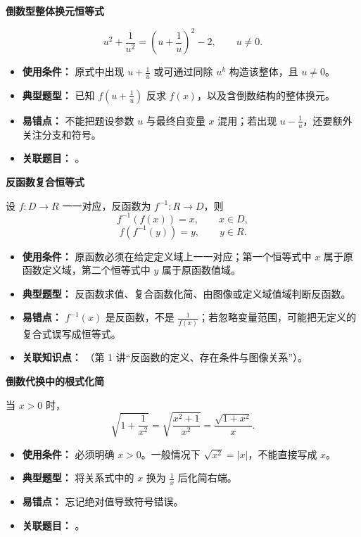
\begin{knowledgeBox}
\textbf{倒数型整体换元恒等式}

\[
u^2+\frac{1}{u^2}=\left(u+\frac{1}{u}\right)^2-2,\qquad u\ne 0.
\]

\begin{itemize}
  \item \textbf{使用条件：} 原式中出现 \(u+\frac{1}{u}\) 或可通过同除 \(u^k\) 构造该整体，且 \(u\ne 0\)。
  \item \textbf{典型题型：} 已知 \(f\left(u+\frac{1}{u}\right)\) 反求 \(f(x)\)，以及含倒数结构的整体换元。
  \item \textbf{易错点：} 不能把题设参数 \(u\) 与最终自变量 \(x\) 混用；若出现 \(u-\frac{1}{u}\)，还要额外关注分支和符号。
  \item \textbf{关联题目：} 。
\end{itemize}

\textbf{反函数复合恒等式}

设 \(f:D\to R\) 一一对应，反函数为 \(f^{-1}:R\to D\)，则
\[
f^{-1}(f(x))=x,\qquad x\in D,
\]
\[
f(f^{-1}(y))=y,\qquad y\in R.
\]

\begin{itemize}
  \item \textbf{使用条件：} 原函数必须在给定定义域上一一对应；第一个恒等式中 \(x\) 属于原函数定义域，第二个恒等式中 \(y\) 属于原函数值域。
  \item \textbf{典型题型：} 反函数求值、复合函数化简、由图像或定义域值域判断反函数。
  \item \textbf{易错点：} \(f^{-1}(x)\) 是反函数，不是 \(\frac{1}{f(x)}\)；若忽略变量范围，可能把无定义的复合式误写成恒等式。
  \item \textbf{关联知识点：} （第 1 讲“反函数的定义、存在条件与图像关系”）。
\end{itemize}

\textbf{倒数代换中的根式化简}

当 \(x>0\) 时，
\[
\sqrt{1+\frac{1}{x^2}}
=\sqrt{\frac{x^2+1}{x^2}}
=\frac{\sqrt{1+x^2}}{x}.
\]

\begin{itemize}
  \item \textbf{使用条件：} 必须明确 \(x>0\)。一般情况下 \(\sqrt{x^2}=|x|\)，不能直接写成 \(x\)。
  \item \textbf{典型题型：} 将关系式中的 \(x\) 换为 \(\frac{1}{x}\) 后化简右端。
  \item \textbf{易错点：} 忘记绝对值导致符号错误。
  \item \textbf{关联题目：} 。
\end{itemize}


\end{knowledgeBox}
